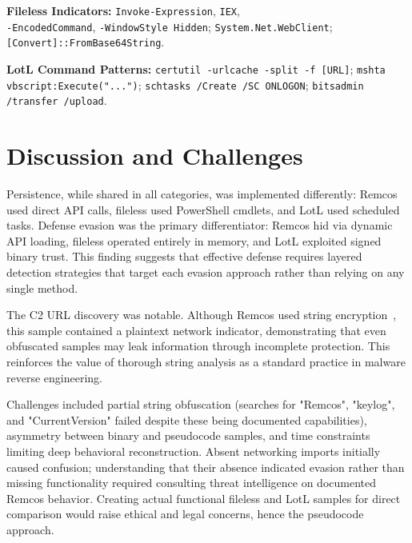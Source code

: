 \documentclass[sigconf]{acmart}
\begin{document}
\quad \textbf{Fileless Indicators:} \texttt{Invoke-Expression}, \texttt{IEX}, \\ \texttt{-EncodedCommand}, \texttt{-WindowStyle Hidden}; \texttt{System.Net.WebClient}; \\ \texttt{[Convert]::FromBase64String}.

\quad \textbf{LotL Command Patterns:} \texttt{certutil -urlcache -split -f [URL]}; \texttt{mshta vbscript:Execute("...")}; \texttt{schtasks /Create /SC ONLOGON}; \texttt{bitsadmin /transfer /upload}.


\section{Discussion and Challenges}

\vspace{0.5em}
\qquad Persistence, while shared in all categories, was implemented differently: Remcos used direct API calls, fileless used PowerShell cmdlets, and LotL used scheduled tasks. Defense evasion was the primary differentiator: Remcos hid via dynamic API loading, fileless operated entirely in memory, and LotL exploited signed binary trust. This finding suggests that effective defense requires layered detection strategies that target each evasion approach rather than relying on any single method.

\qquad The C2 URL discovery was notable. Although Remcos used string encryption~\cite{elastic2024remcos}, this sample contained a plaintext network indicator, demonstrating that even obfuscated samples may leak information through incomplete protection. This reinforces the value of thorough string analysis as a standard practice in malware reverse engineering.

\qquad Challenges included partial string obfuscation (searches for "Remcos", "keylog", and "CurrentVersion" failed despite these being documented capabilities), asymmetry between binary and pseudocode samples, and time constraints limiting deep behavioral reconstruction. Absent networking imports initially caused confusion; understanding that their absence indicated evasion rather than missing functionality required consulting threat intelligence on documented Remcos behavior. Creating actual functional fileless and LotL samples for direct comparison would raise ethical and legal concerns, hence the pseudocode approach.
\end{document}
